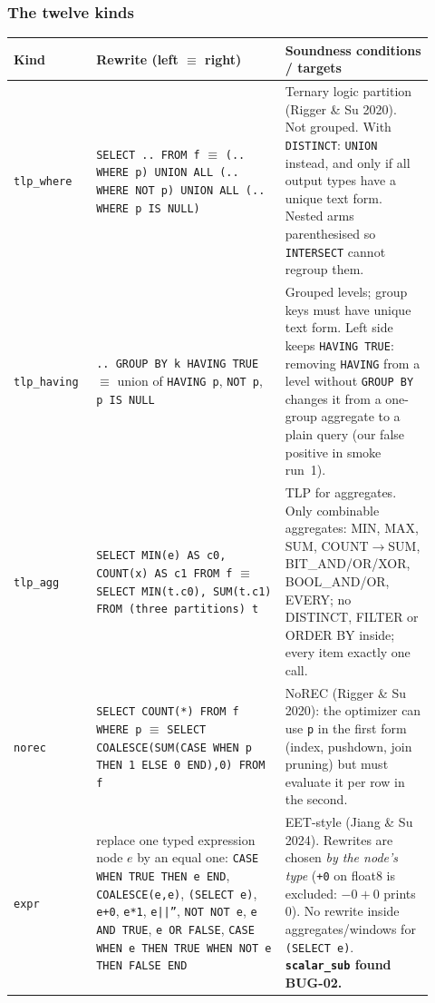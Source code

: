 \subsubsection*{The twelve kinds}

\begin{longtable}{p{0.17\linewidth}p{0.42\linewidth}p{0.33\linewidth}}
\toprule
\textbf{Kind} & \textbf{Rewrite (left $\equiv$ right)} & \textbf{Soundness conditions / targets} \\
\midrule
\endhead
\texttt{tlp\_where} & \texttt{SELECT .. FROM f} $\equiv$ \texttt{(.. WHERE p) UNION ALL (.. WHERE NOT p) UNION ALL (.. WHERE p IS NULL)} & Ternary logic partition (Rigger \& Su 2020). Not grouped. With \texttt{DISTINCT}: \texttt{UNION} instead, and only if all output types have a unique text form. Nested arms parenthesised so \texttt{INTERSECT} cannot regroup them. \\
\texttt{tlp\_having} & \texttt{.. GROUP BY k HAVING TRUE} $\equiv$ union of \texttt{HAVING p}, \texttt{NOT p}, \texttt{p IS NULL} & Grouped levels; group keys must have unique text form. Left side keeps \texttt{HAVING TRUE}: removing \texttt{HAVING} from a level without \texttt{GROUP BY} changes it from a one-group aggregate to a plain query (our false positive in smoke run~1). \\
\texttt{tlp\_agg} & \texttt{SELECT MIN(e) AS c0, COUNT(x) AS c1 FROM f} $\equiv$ \texttt{SELECT MIN(t.c0), SUM(t.c1) FROM (three partitions) t} & TLP for aggregates. Only combinable aggregates: MIN, MAX, SUM, COUNT$\rightarrow$SUM, BIT\_AND/OR/XOR, BOOL\_AND/OR, EVERY; no DISTINCT, FILTER or ORDER BY inside; every item exactly one call. \\
\texttt{norec} & \texttt{SELECT COUNT(*) FROM f WHERE p} $\equiv$ \texttt{SELECT COALESCE(SUM(CASE WHEN p THEN 1 ELSE 0 END),0) FROM f} & NoREC (Rigger \& Su 2020): the optimizer can use \texttt{p} in the first form (index, pushdown, join pruning) but must evaluate it per row in the second. \\
\texttt{expr} & replace one typed expression node $e$ by an equal one: \texttt{CASE WHEN TRUE THEN e END}, \texttt{COALESCE(e,e)}, \texttt{(SELECT e)}, \texttt{e+0}, \texttt{e*1}, \texttt{e||''}, \texttt{NOT NOT e}, \texttt{e AND TRUE}, \texttt{e OR FALSE}, \texttt{CASE WHEN e THEN TRUE WHEN NOT e THEN FALSE END} & EET-style (Jiang \& Su 2024). Rewrites are chosen \emph{by the node's type} (\texttt{+0} on float8 is excluded: $-0+0$ prints 0). No rewrite inside aggregates/windows for \texttt{(SELECT e)}. \textbf{\texttt{scalar\_sub} found BUG-02.} \\

\end{longtable}
